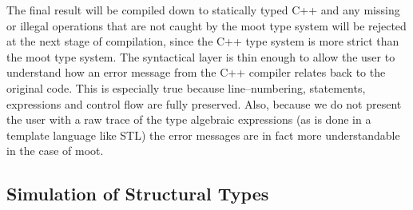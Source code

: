 \documentclass{sigplanconf}
\begin{document}
The final result will be compiled down to statically typed C++ and any
missing or illegal operations that are not caught by the {\sc moot}
type system will be rejected at the next stage of compilation, since
the C++ type system is more strict than the {\sc moot} type system.
The syntactical layer is thin enough to allow the user to understand
how an error message from the C++ compiler relates back to the
original code. This is especially true because line--numbering,
statements, expressions and control flow are fully preserved.
Also, because we do not present the user with a raw trace of the type
algebraic expressions (as is done in a template language like STL) the
error messages are in fact more understandable in the case of {\sc
  moot}.

\subsection{Simulation of Structural Types}
\end{document}
